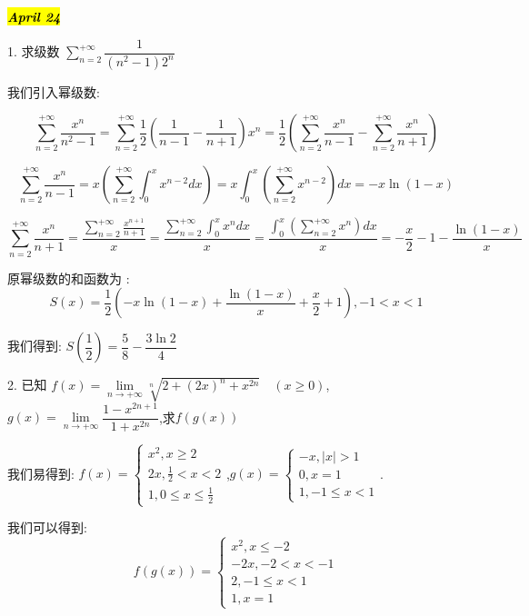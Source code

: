 \hl{\textbf{\textit{April 24}}}

1. 求级数 $\sum\limits_{n=2}^{+\infty}\dfrac{1}{(n^2-1)2^n}$
\begin{solution}
	
	我们引入幂级数: 
	
	$$\sum\limits_{n=2}^{+\infty}\frac{x^n}{n^2-1}=\sum\limits_{n=2}^{+\infty}\frac{1}{2}(\frac{1}{n-1}-\frac{1}{n+1})x^n=\frac{1}{2}(\sum\limits_{n=2}^{+\infty}\frac{x^n}{n-1}-\sum\limits_{n=2}^{+\infty}\frac{x^n}{n+1})$$
	
	$$\sum\limits_{n=2}^{+\infty}\frac{x^n}{n-1}=x(\sum\limits_{n=2}^{+\infty}\int_{0}^{x}x^{n-2}dx)=x\int_{0}^{x}(\sum\limits_{n=2}^{+\infty}x^{n-2})dx=-x\ln(1-x)$$
	
	$$\sum\limits_{n=2}^{+\infty}\frac{x^n}{n+1}=\frac{\sum\limits_{n=2}^{+\infty}\frac{x^{n+1}}{n+1}}{x}=\frac{\sum\limits_{n=2}^{+\infty}\int_{0}^{x}x^ndx}{x}=\frac{\int_{0}^{x}(\sum\limits_{n=2}^{+\infty}x^n)dx}{x}=-\frac{x}{2}-1-\frac{\ln(1-x)}{x}$$
	
	原幂级数的和函数为 : 
	$$S(x)=\frac{1}{2}(-x\ln(1-x)+\frac{\ln(1-x)}{x}+\frac{x}{2}+1),-1<x<1$$
	
	我们得到: $S(\dfrac{1}{2})=\dfrac{5}{8}-\dfrac{3\ln 2}{4}$
\end{solution}

2. 已知 $f(x)=\lim\limits_{n\rightarrow  +\infty}\sqrt[n]{2+(2x)^{n}+x^{2n}}\quad (x\geq 0)$,$g(x)=\lim\limits_{n\rightarrow +\infty}\dfrac{1-x^{2n+1}}{1+x^{2n}}$,求$f(g(x))$
\begin{solution}
	
	我们易得到: $f(x)=\left\lbrace 
	\begin{array}{l}
		x^2,x\geq 2\\
		2x,\frac{1}{2}<x< 2\\
		1,0\leq x\leq \frac{1}{2}
	\end{array}
	\right. $,\quad $g(x)=\left\lbrace 
	\begin{array}{l}
		-x,|x|> 1\\
		0,x=1\\
		1,-1\leq x<1
	\end{array}
	\right. $.
	
	我们可以得到: 
	$$f(g(x))=\left\lbrace 
	\begin{array}{l}
		x^2,x\leq -2\\
		-2x,-2<x<-1\\
		2,-1\leq x<1\\
		1,x=1	
	\end{array}
	\right. $$
\end{solution}

